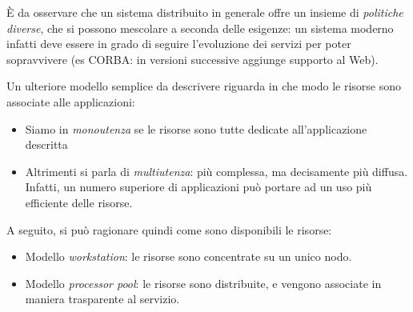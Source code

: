 È da osservare che un sistema distribuito in generale offre un insieme di \textit{politiche diverse}, che si possono
mescolare a seconda delle esigenze: un sistema moderno infatti deve essere in grado di seguire l'evoluzione dei servizi
per poter sopravvivere (es CORBA: in versioni successive aggiunge supporto al Web).

Un ulteriore modello semplice da descrivere riguarda in che modo le risorse
sono associate alle applicazioni:
\begin{itemize}
 \item Siamo in \textit{monoutenza} se le risorse sono tutte dedicate all'applicazione descritta
 \item Altrimenti si parla di \textit{multiutenza}: più complessa, ma decisamente più diffusa. Infatti, un numero
superiore di applicazioni può portare ad un uso più efficiente delle risorse.
\end{itemize}
A seguito, si può ragionare quindi come sono disponibili le risorse:
\begin{itemize}
 \item Modello \textit{workstation}: le risorse sono concentrate su un unico nodo.
 \item Modello \textit{processor pool}: le risorse sono distribuite, e vengono associate in maniera trasparente al
servizio.
\end{itemize}

